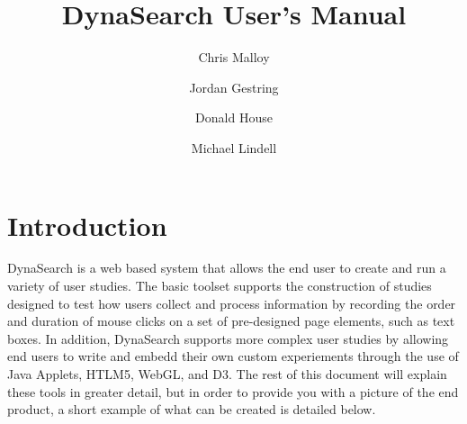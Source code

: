 \documentclass[article]{ij4uq}              %
\begin{document}
\title{DynaSearch User's Manual}
\titlehead{DynaSearch User's Manual}


\author[1]{Chris Malloy}
\author[1]{Jordan Gestring}
\author[1]{Donald House}
\author[2]{Michael Lindell}
\address[1]{ School of Computing, 100 McAdams Hall, Clemson University, Clemson, SC 29634-0974, USA}
\address[2]{Hazard Reduction \& Recovery Center, College of Architecture, Texas A\&M University, College Station, TX 77843-3137, USA}






\dataO{\mydate\today}
\dataF{\mydate\today}

\abstract{
}




\maketitle




\section{Introduction}

DynaSearch is a web based system that allows the end user to create and run a variety of user studies.  The basic toolset supports the construction of studies designed to test how users collect and process information by recording the order and duration of mouse clicks on a set of pre-designed page elements, such as text boxes.  In addition, DynaSearch supports more complex user studies by allowing end users to write and embedd their own custom experiements through the use of Java Applets, HTLM5, WebGL, and D3.  The rest of this document will explain these tools in greater detail, but in order to provide you with a picture of the end product, a short example of what can be created is detailed below.
\end{document}
